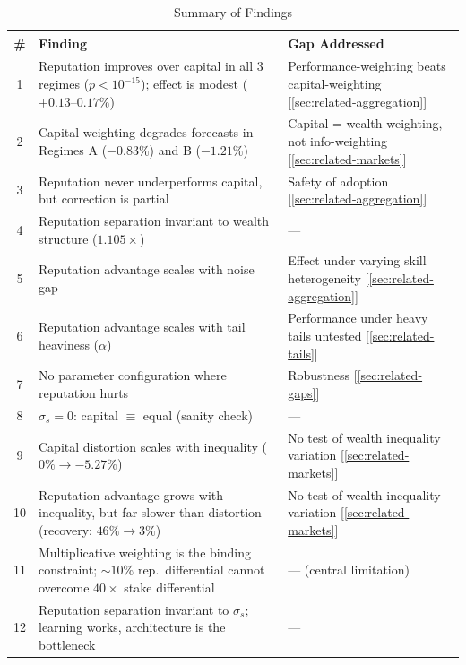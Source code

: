 \documentclass[conference]{IEEEtran}
\begin{document}
\begin{table}[t]
\centering
\caption{Summary of Findings}
\label{tab:findings}
\begin{tabular}{@{}cp{9.5cm}p{5.5cm}@{}}
\toprule
\textbf{\#} & \textbf{Finding} & \textbf{Gap Addressed} \\
\midrule
1  & Reputation improves over capital in all 3 regimes ($p < 10^{-15}$); effect is modest ($+0.13$--$0.17\%$) & Performance-weighting beats capital-weighting [\ref{sec:related-aggregation}] \\
2  & Capital-weighting degrades forecasts in Regimes A ($-0.83\%$) and B ($-1.21\%$) & Capital = wealth-weighting, not info-weighting [\ref{sec:related-markets}] \\
3  & Reputation never underperforms capital, but correction is partial & Safety of adoption [\ref{sec:related-aggregation}] \\
4  & Reputation separation invariant to wealth structure ($1.105\times$) & --- \\
5  & Reputation advantage scales with noise gap & Effect under varying skill heterogeneity [\ref{sec:related-aggregation}] \\
6  & Reputation advantage scales with tail heaviness ($\alpha$) & Performance under heavy tails untested [\ref{sec:related-tails}] \\
7  & No parameter configuration where reputation hurts & Robustness [\ref{sec:related-gaps}] \\
8  & $\sigma_s = 0$: capital $\equiv$ equal (sanity check) & --- \\
9  & Capital distortion scales with inequality ($0\% \to -5.27\%$) & No test of wealth inequality variation [\ref{sec:related-markets}] \\
10 & Reputation advantage grows with inequality, but far slower than distortion (recovery: $46\% \to 3\%$) & No test of wealth inequality variation [\ref{sec:related-markets}] \\
11 & Multiplicative weighting is the binding constraint; ${\sim}10\%$ rep.\ differential cannot overcome $40\times$ stake differential & --- (central limitation) \\
12 & Reputation separation invariant to $\sigma_s$; learning works, architecture is the bottleneck & --- \\
\bottomrule
\end{tabular}
\end{table}

\end{document}
